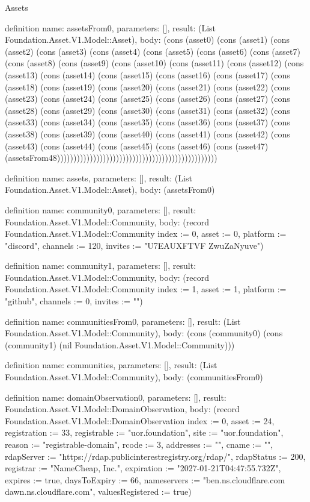 \begin{lexlean}{Assets}
\begin{semanticmodule}
definition{
  name: assetsFrom0,
  parameters: [],
  result: (List Foundation.Asset.V1.Model::Asset),
  body: (cons (asset0) (cons (asset1) (cons (asset2) (cons (asset3) (cons (asset4) (cons (asset5) (cons (asset6) (cons (asset7) (cons (asset8) (cons (asset9) (cons (asset10) (cons (asset11) (cons (asset12) (cons (asset13) (cons (asset14) (cons (asset15) (cons (asset16) (cons (asset17) (cons (asset18) (cons (asset19) (cons (asset20) (cons (asset21) (cons (asset22) (cons (asset23) (cons (asset24) (cons (asset25) (cons (asset26) (cons (asset27) (cons (asset28) (cons (asset29) (cons (asset30) (cons (asset31) (cons (asset32) (cons (asset33) (cons (asset34) (cons (asset35) (cons (asset36) (cons (asset37) (cons (asset38) (cons (asset39) (cons (asset40) (cons (asset41) (cons (asset42) (cons (asset43) (cons (asset44) (cons (asset45) (cons (asset46) (cons (asset47) (assetsFrom48)))))))))))))))))))))))))))))))))))))))))))))))))
}

definition{
  name: assets,
  parameters: [],
  result: (List Foundation.Asset.V1.Model::Asset),
  body: (assetsFrom0)
}

definition{
  name: community0,
  parameters: [],
  result: Foundation.Asset.V1.Model::Community,
  body: (record Foundation.Asset.V1.Model::Community {index := 0, asset := 0, platform := "discord", channels := 120, invites := "U7EAUXFTVF ZwuZaNyuve"})
}

definition{
  name: community1,
  parameters: [],
  result: Foundation.Asset.V1.Model::Community,
  body: (record Foundation.Asset.V1.Model::Community {index := 1, asset := 1, platform := "github", channels := 0, invites := ""})
}

definition{
  name: communitiesFrom0,
  parameters: [],
  result: (List Foundation.Asset.V1.Model::Community),
  body: (cons (community0) (cons (community1) (nil Foundation.Asset.V1.Model::Community)))
}

definition{
  name: communities,
  parameters: [],
  result: (List Foundation.Asset.V1.Model::Community),
  body: (communitiesFrom0)
}

definition{
  name: domainObservation0,
  parameters: [],
  result: Foundation.Asset.V1.Model::DomainObservation,
  body: (record Foundation.Asset.V1.Model::DomainObservation {index := 0, asset := 24, registration := 33, registrable := "uor.foundation", site := "uor.foundation", reason := "registrable-domain", rcode := 3, addresses := "", cname := "", rdapServer := "https://rdap.publicinterestregistry.org/rdap/", rdapStatus := 200, registrar := "NameCheap, Inc.", expiration := "2027-01-21T04:47:55.732Z", expires := true, daysToExpiry := 66, nameservers := "ben.ns.cloudflare.com dawn.ns.cloudflare.com", valuesRegistered := true})
}


\end{semanticmodule}
\end{lexlean}
